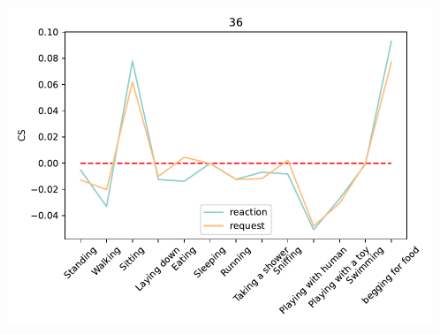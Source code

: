 \begin{figure}[ht]
\begin{minipage}[b]{.3\linewidth}
			\includegraphics[width=0.99\linewidth]{./35word/36.pdf}
		\end{minipage}
		

\end{figure}
